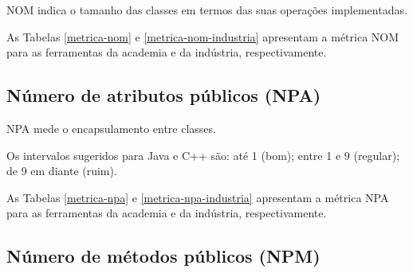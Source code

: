 NOM indica o tamanho das classes em termos das suas operações implementadas.

As Tabelas \ref{metrica-nom} e \ref{metrica-nom-industria} apresentam a
métrica NOM para as ferramentas da academia e da indústria, respectivamente.



\subsection{Número de atributos públicos (NPA)}

NPA mede o encapsulamento entre classes.

Os intervalos sugeridos para Java e C++ são: até 1 (bom); entre 1 e 9
(regular); de 9 em diante (ruim).

As Tabelas \ref{metrica-npa} e \ref{metrica-npa-industria} apresentam a
métrica NPA para as ferramentas da academia e da indústria, respectivamente.



\subsection{Número de métodos públicos (NPM)}

